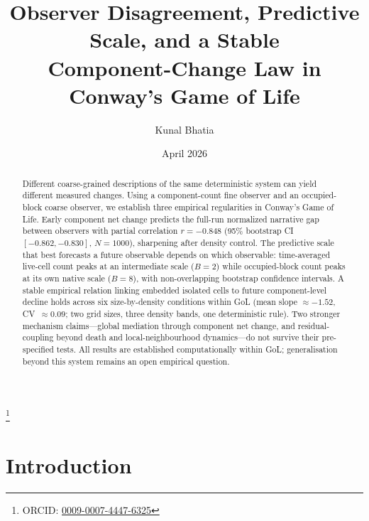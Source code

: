 \documentclass[aip,cha,preprint,nofootinbib]{revtex4-2}
\begin{document}
\title{Observer Disagreement, Predictive Scale, and a Stable\\
       Component-Change Law in Conway's Game of Life}

\author{Kunal Bhatia}
\thanks{ORCID: \href{https://orcid.org/0009-0007-4447-6325}{0009-0007-4447-6325}}

\date{April 2026}

\begin{abstract}
Different coarse-grained descriptions of the same deterministic system can
yield different measured changes.
Using a component-count fine observer and an occupied-block coarse observer,
we establish three empirical regularities in Conway's Game of Life.
Early component net change predicts the full-run normalized narrative gap
between observers with partial correlation $r=-0.848$
(95\% bootstrap CI $[-0.862,-0.830]$, $N=1000$), sharpening after density
control.
The predictive scale that best forecasts a future observable depends on which
observable: time-averaged live-cell count peaks at an intermediate scale
($B=2$) while occupied-block count peaks at its own native scale ($B=8$),
with non-overlapping bootstrap confidence intervals.
A stable empirical relation linking embedded isolated cells to future
component-level decline holds across six size-by-density conditions
within GoL (mean slope $\approx-1.52$, CV~$\approx0.09$; two grid sizes,
three density bands, one deterministic rule).
Two stronger mechanism claims---global mediation through component net change,
and residual-coupling beyond death and local-neighbourhood dynamics---do not
survive their pre-specified tests.
All results are established computationally within GoL; generalisation
beyond this system remains an open empirical question.
\end{abstract}


\maketitle

\section{Introduction}
\label{sec:intro}
\end{document}
